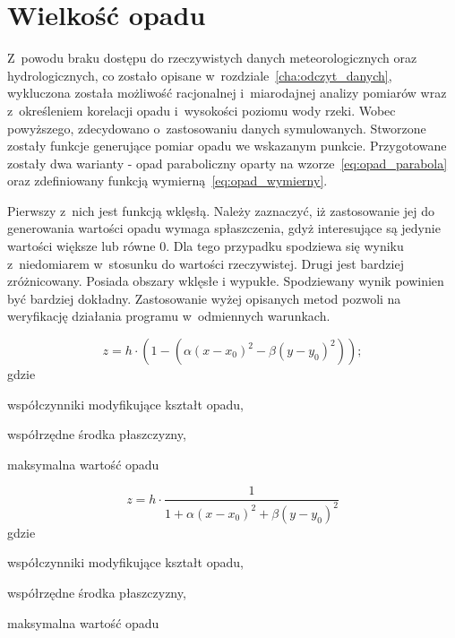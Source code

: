 \section{Wielkość opadu}
Z~powodu braku dostępu do rzeczywistych danych meteorologicznych oraz hydrologicznych, co zostało opisane w~rozdziale~\ref{cha:odczyt_danych}, wykluczona została możliwość racjonalnej i~miarodajnej analizy pomiarów wraz z~określeniem korelacji opadu i~wysokości poziomu wody rzeki. Wobec powyższego, zdecydowano o~zastosowaniu danych symulowanych. Stworzone zostały funkcje generujące pomiar opadu we wskazanym punkcie. Przygotowane zostały dwa warianty - opad paraboliczny oparty na wzorze~\ref{eq:opad_parabola} oraz zdefiniowany funkcją wymierną~\ref{eq:opad_wymierny}.


Pierwszy z~nich jest funkcją wklęsłą. Należy zaznaczyć, iż zastosowanie jej do generowania wartości opadu wymaga spłaszczenia, gdyż interesujące są jedynie wartości większe lub równe 0. Dla tego przypadku spodziewa się wyniku z~niedomiarem w~stosunku do wartości rzeczywistej. Drugi jest bardziej zróżnicowany. Posiada obszary wklęsłe i wypukłe. Spodziewany wynik powinien być bardziej dokładny. Zastosowanie wyżej opisanych metod pozwoli na weryfikację działania programu w~odmiennych warunkach.

\begin{equation}
z = h \cdot (1 - (\alpha (x - x_0)^2 - \beta (y - y_0)^2) );
\label{eq:opad_parabola}
\end{equation}
gdzie
\begin{description}[leftmargin=3cm, itemsep=0cm, labelsep=0cm]
	\item[$\alpha, \beta$] współczynniki modyfikujące kształt opadu,
	\item[$x_0, y_0$] współrzędne środka płaszczyzny,
	\item[$h$] maksymalna wartość opadu
\end{description}

\begin{equation}
z = h \cdot \frac{1}{1 + \alpha (x-x_0)^2 + \beta (y-y_0)^2}
\label{eq:opad_wymierny}
\end{equation}
gdzie
\begin{description}[leftmargin=3cm, itemsep=0cm, labelsep=0cm]
	\item[$\alpha, \beta$] współczynniki modyfikujące kształt opadu,
	\item[$x_0, y_0$] współrzędne środka płaszczyzny,
	\item[$h$] maksymalna wartość opadu
\end{description}


